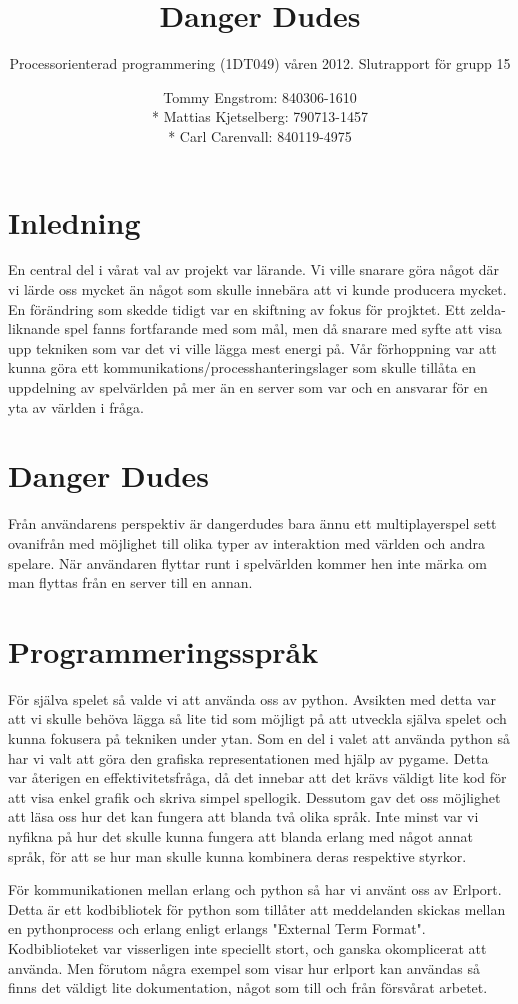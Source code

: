 \documentclass{scrartcl}
\title{Danger Dudes}
\subtitle{Processorienterad programmering (1DT049) våren 2012. Slutrapport för grupp 15}
\author{Tommy Engstrom: 840306-1610 \\* Mattias Kjetselberg: 790713-1457 \\*  Carl Carenvall: 840119-4975}
\begin{document}
\maketitle
\newpage

\tableofcontents

\section{Inledning}
En central del i vårat val av projekt var lärande. Vi ville snarare göra något där vi lärde oss mycket än något som skulle innebära att vi kunde producera mycket.
\smallskip
En förändring som skedde tidigt var en skiftning av fokus för projktet. Ett zelda-liknande spel fanns fortfarande med som mål, men då snarare med syfte att visa upp tekniken som var det vi ville lägga mest energi på. Vår förhoppning var att kunna göra ett kommunikations/processhanteringslager som skulle tillåta en uppdelning av spelvärlden på mer än en server som var och en ansvarar för en yta av världen i fråga.

\medskip
\section{Danger Dudes}
Från användarens perspektiv är dangerdudes bara ännu ett multiplayerspel sett ovanifrån med möjlighet till olika typer av interaktion med världen och andra spelare. När användaren flyttar runt i spelvärlden kommer hen inte märka om man flyttas från en server till en annan.

\medskip
\section{Programmeringsspråk}
För själva spelet så valde vi att använda oss av python. Avsikten med detta var att vi skulle behöva lägga så lite tid som möjligt på att utveckla själva spelet och kunna fokusera på tekniken under ytan. Som en del i valet att använda python så har vi valt att göra den grafiska representationen med hjälp av pygame. Detta var återigen en effektivitetsfråga, då det innebar att det krävs väldigt lite kod för att visa enkel grafik och skriva simpel spellogik.
\smallskip
Dessutom gav det oss möjlighet att läsa oss hur det kan fungera att blanda två olika språk. Inte minst var vi nyfikna på hur det skulle kunna fungera att blanda erlang med något annat språk, för att se hur man skulle kunna kombinera deras respektive styrkor.
\smallskip

För kommunikationen mellan erlang och python så har vi använt oss av Erlport. Detta är ett kodbibliotek för python som tillåter att meddelanden skickas mellan en pythonprocess och erlang enligt erlangs "External Term Format". \linebreak
Kodbiblioteket var visserligen inte speciellt stort, och ganska okomplicerat att använda. Men förutom några exempel som visar hur erlport kan användas så finns det väldigt lite dokumentation, något som till och från försvårat arbetet.
\end{document}
